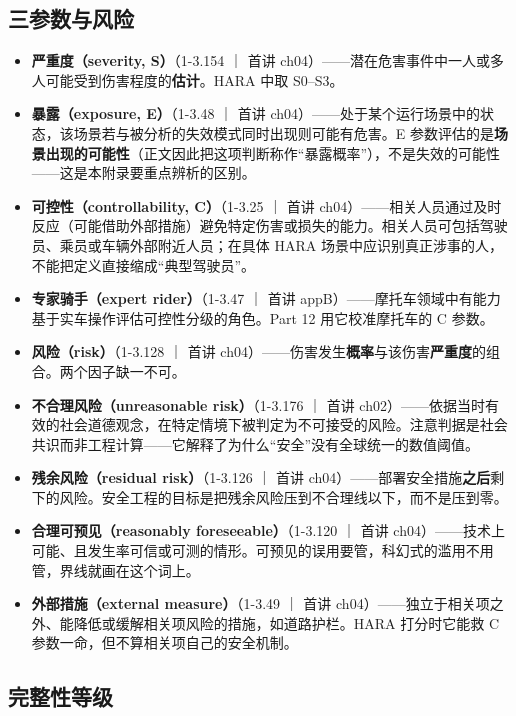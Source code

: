 \subsection{三参数与风险}

\begin{itemize}
\item \textbf{严重度（severity, S）}（1-3.154 ｜ 首讲 ch04）——潜在危害事件中一人或多人可能受到伤害程度的\textbf{估计}。HARA 中取 S0–S3。
\item \textbf{暴露（exposure, E）}（1-3.48 ｜ 首讲 ch04）——处于某个运行场景中的状态，该场景若与被分析的失效模式同时出现则可能有危害。E 参数评估的是\textbf{场景出现的可能性}（正文因此把这项判断称作“暴露概率”），不是失效的可能性——这是本附录要重点辨析的区别。
\item \textbf{可控性（controllability, C）}（1-3.25 ｜ 首讲 ch04）——相关人员通过及时反应（可能借助外部措施）避免特定伤害或损失的能力。相关人员可包括驾驶员、乘员或车辆外部附近人员；在具体 HARA 场景中应识别真正涉事的人，不能把定义直接缩成“典型驾驶员”。
\item \textbf{专家骑手（expert rider）}（1-3.47 ｜ 首讲 appB）——摩托车领域中有能力基于实车操作评估可控性分级的角色。Part 12 用它校准摩托车的 C 参数。
\item \textbf{风险（risk）}（1-3.128 ｜ 首讲 ch04）——伤害发生\textbf{概率}与该伤害\textbf{严重度}的组合。两个因子缺一不可。
\item \textbf{不合理风险（unreasonable risk）}（1-3.176 ｜ 首讲 ch02）——依据当时有效的社会道德观念，在特定情境下被判定为不可接受的风险。注意判据是社会共识而非工程计算——它解释了为什么“安全”没有全球统一的数值阈值。
\item \textbf{残余风险（residual risk）}（1-3.126 ｜ 首讲 ch04）——部署安全措施\textbf{之后}剩下的风险。安全工程的目标是把残余风险压到不合理线以下，而不是压到零。
\item \textbf{合理可预见（reasonably foreseeable）}（1-3.120 ｜ 首讲 ch04）——技术上可能、且发生率可信或可测的情形。可预见的误用要管，科幻式的滥用不用管，界线就画在这个词上。
\item \textbf{外部措施（external measure）}（1-3.49 ｜ 首讲 ch04）——独立于相关项之外、能降低或缓解相关项风险的措施，如道路护栏。HARA 打分时它能救 C 参数一命，但不算相关项自己的安全机制。
\end{itemize}

\subsection{完整性等级}

